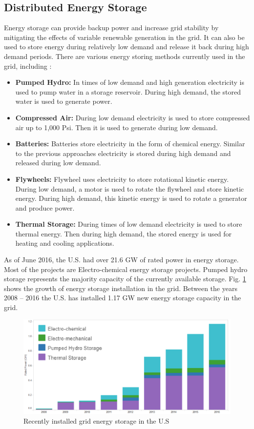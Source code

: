 \subsection{Distributed Energy Storage}
Energy storage can provide backup power and increase grid stability by mitigating the effects of variable renewable generation in the grid. It can also be used to store energy during relatively low demand and release it back during high demand periods. There are various energy storing methods currently used in the grid, including \cite{GE1}:
\begin{itemize}
    \item \textbf{Pumped Hydro:} In times of low demand and high generation electricity is used to pump water in a storage reservoir. During high demand, the stored water is used to generate power.
    \item \textbf{Compressed Air:} During low demand electricity is used to store compressed air up to 1,000 Psi. Then it is used to generate during low demand.
    \item \textbf{Batteries:} Batteries store electricity in the form of chemical energy. Similar to the previous approaches electricity is stored during high demand and released during low demand.
    \item \textbf{Flywheels:} Flywheel uses electricity to store rotational kinetic energy. During low demand, a motor is used to rotate the flywheel and store kinetic energy. During high demand, this kinetic energy is used to rotate a generator and produce power.
    \item \textbf{Thermal Storage:} During times of low demand electricity is used to store thermal energy. Then during high demand, the stored energy is used for heating and cooling applications.
\end{itemize}

As of June 2016, the U.S. had over 21.6 GW of rated power in energy storage. Most of the projects are Electro-chemical energy storage projects. Pumped hydro storage represents the majority capacity of the currently available storage. Fig. \ref{fig:ES_INCREASE} shows the growth of energy storage installation in the grid. Between the years 2008 – 2016 the U.S. has installed 1.17 GW new energy storage capacity in the grid. 

\begin{figure}[!h]
\centering
\includegraphics[width=0.85\linewidth]{figs/ES_INCREASE.png}
\caption[Recently installed grid energy storage in the U.S.]{Recently installed grid energy storage in the U.S \cite{GE2}}
\label{fig:ES_INCREASE}
\end{figure}


